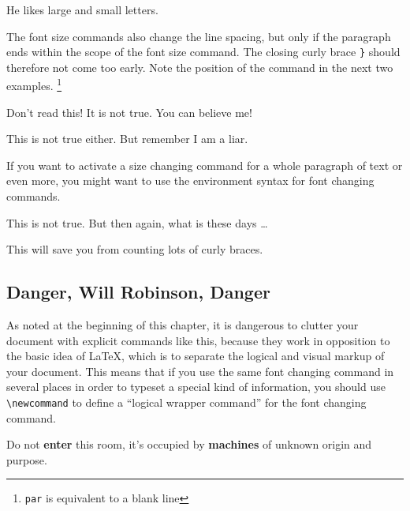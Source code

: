 \begin{example}
He likes {\LARGE large and
{\small small} letters}.
\end{example}

The font size commands also change the line spacing, but only if the
paragraph ends within the scope of the font size command. The closing curly
brace \verb|}| should therefore not come too early.  Note the position of
the  command in the next two examples. \footnote{\texttt{\bs{}par}
is equivalent to a blank line}


\begin{example}
{\Large Don't read this!
 It is not true.
 You can believe me!\par}
\end{example}

\begin{example}
{\Large This is not true either.
But remember I am a liar.}\par
\end{example}

If you want to activate a size changing command for a whole paragraph
of text or even more, you might want to use the environment syntax for
font changing commands.

\begin{example}
\begin{Large}
This is not true.
But then again, what is these
days \ldots
\end{Large}
\end{example}

\noindent This will save you from counting lots of curly braces.

\subsection{Danger, Will Robinson, Danger}

As noted at the beginning of this chapter, it is dangerous to clutter
your document with explicit commands like this, because they work in
opposition to the basic idea of \LaTeX{}, which is to separate the
logical and visual markup of your document.  This means that if you
use the same font changing command in several places in order to
typeset a special kind of information, you should use
\verb|\newcommand| to define a ``logical wrapper command'' for the font
changing command.

\begin{example}
\newcommand{\oops}[1]{%
 \textbf{#1}}
Do not \oops{enter} this room,
it's occupied by \oops{machines}
of unknown origin and purpose.
\end{example}

